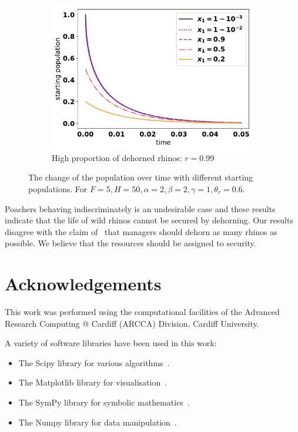 \documentclass[10pt]{article}
\begin{document}
\begin{figure}[!htbp]
\begin{subfigure}{.3\textwidth}
    \includegraphics[width=\textwidth]{images/IndiscriminateESS-high-r.pdf}
    \caption{High proportion of dehorned rhinos: \(r=0.99\)}
    \end{subfigure}%
    \caption{\label{fig:indiscriminate_ess} The change of the population over 
    time with different starting populations. For \(F=5, H=50,  
    \alpha=2, \beta=2, \gamma=1, \theta_r=0.6\).}
\end{figure}

Poachers behaving indiscriminately is an undesirable case and these results
indicate that the life of
wild rhinos cannot be secured by dehorning. Our results disagree with the
claim of~\cite{Milner1992} that managers should dehorn
as many rhinos as possible. We believe that the resources should be 
assigned to security.

\section*{Acknowledgements}

This work was performed using the computational facilities of the Advanced
Research Computing @ Cardiff (ARCCA) Division, Cardiff University.

A variety of software libraries have been used in this work:

\begin{itemize}
    \item The Scipy library for various algorithms~\cite{scipy}.
    \item The Matplotlib library for visualisation~\cite{hunter2007matplotlib}.
    \item The SymPy library for symbolic mathematics~\cite{sympy}.
    \item The Numpy library for data manipulation~\cite{walt2011numpy}.
\end{itemize}




\end{document}
